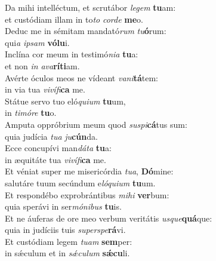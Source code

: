 \evenverse Da mihi intelléctum, et scrutábor \textit{le}\textit{gem} \textbf{tu}am:~\*\\
\evenverse et custódiam illam in to\textit{to} \textit{cor}\textit{de} \textbf{me}o.\\
\oddverse Deduc me in sémitam mandató\textit{rum} \textit{tu}\textbf{ó}rum:~\*\\
\oddverse qui\textit{a} \textit{i}\textit{psam} \textbf{vó}\textbf{lu}i.\\
\evenverse Inclína cor meum in testimó\textit{ni}\textit{a} \textbf{tu}a:~\*\\
\evenverse et non \textit{in} \textit{a}\textit{va}\textbf{rí}\textbf{ti}am.\\
\oddverse Avérte óculos meos ne vídeant \textit{va}\textit{ni}\textbf{tá}tem:~\*\\
\oddverse in via tua \textit{vi}\textit{ví}\textit{fi}\textbf{ca} me.\\
\evenverse Státue servo tuo eló\textit{qui}\textit{um} \textbf{tu}um,~\*\\
\evenverse in \textit{ti}\textit{mó}\textit{re} \textbf{tu}o.\\
\oddverse Amputa oppróbrium meum quod \textit{su}\textit{spi}\textbf{cá}tus sum:~\*\\
\oddverse quia judícia \textit{tu}\textit{a} \textit{ju}\textbf{cún}da.\\
\evenverse Ecce concupívi man\textit{dá}\textit{ta} \textbf{tu}a:~\*\\
\evenverse in æquitáte tua \textit{vi}\textit{ví}\textit{fi}\textbf{ca} me.\\
\oddverse Et véniat super me misericórdia \textit{tu}\textit{a}, \textbf{Dó}mine:~\*\\
\oddverse salutáre tuum secúndum e\textit{ló}\textit{qui}\textit{um} \textbf{tu}um.\\
\evenverse Et respondébo exprobrántibus \textit{mi}\textit{hi} \textbf{ver}bum:~\*\\
\evenverse quia sperávi in ser\textit{mó}\textit{ni}\textit{bus} \textbf{tu}is.\\
\oddverse Et ne áuferas de ore meo verbum veritátis \textit{us}\textit{que}\textbf{quá}que:~\*\\
\oddverse quia in judíciis tuis \textit{su}\textit{per}\textit{spe}\textbf{rá}vi.\\
\evenverse Et custódiam legem \textit{tu}\textit{am} \textbf{sem}per:~\*\\
\evenverse in sǽculum et in \textit{sǽ}\textit{cu}\textit{lum} \textbf{sǽ}\textbf{cu}li.\\
